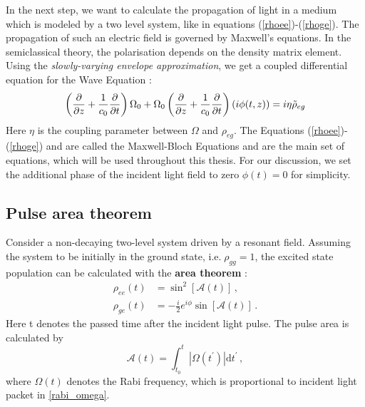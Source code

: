 In the next step, we want to calculate the propagation of light in a medium which is modeled by a two level system, like in equations (\ref{rhoee})-(\ref{rhoge}). The propagation of such an electric field is governed by Maxwell's equations. In the semiclassical theory, the polarisation depends on the density matrix element. Using the \textit{slowly-varying envelope approximation}, we get a coupled differential equation for the Wave Equation \cite{PhysRevA.76.033817,Scully_Zubairy_1997,reiser2014time}:
\begin{equation} \label{waveeq}
    \left(\frac{\partial}{\partial z} + \frac{1}{c_0} \frac{\partial}{\partial t} \right) \Omega_0+  \Omega_0\left(\frac{\partial}{\partial z} + \frac{1}{c_0} \frac{\partial}{\partial t} \right) \left(i\phi(t,z) \right) = i\eta \Tilde{\rho}_{eg}
\end{equation}
Here $\eta$ is the coupling parameter between $\Omega$ and $\rho_{eg}$. The Equations (\ref{rhoee})-(\ref{rhoge}) and  are called the Maxwell-Bloch Equations and are the main set of equations, which will be used throughout this thesis. For our discussion, we set the additional phase of the incident light field to zero $\phi(t) = 0$ for simplicity. 

\subsection{Pulse area theorem}\label{section:pulseareatheorem}
Consider a non-decaying two-level system driven by a resonant field. Assuming the system to be initially in the ground state, i.e.$\;\rho_{gg} = 1$, the excited state population can be calculated with the \textbf{area theorem} \cite{allen1987optical, meystre2007elements}:
\begin{subequations}
\begin{align}
    \rho_{ee}(t) &= \sin^2[\mathcal{A}(t)] \label{pulse_area_theorem_rhoee}\, ,\\
    \rho_{ge}(t) &= - \frac{i}{2} e^{i\phi} \sin[\mathcal{A}(t)] \label{pulse_area_theorem_rhoge}\, .
\end{align}
\end{subequations}
Here t denotes the passed time after the incident light pulse. The pulse area is calculated by
\begin{equation}
    \mathcal{A}(t) = \int_{t_0}^t |\Omega(t^\prime)| \mathrm{d}t^\prime\, , 
\end{equation}
where $\Omega(t)$ denotes the Rabi frequency, which is proportional to incident light packet in \cref{rabi_omega}.

